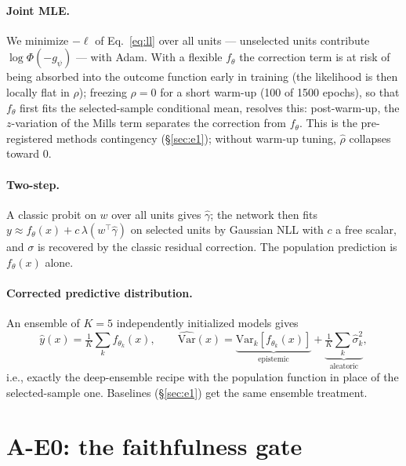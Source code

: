 \documentclass[10pt]{article}
\newcommand{\IMR}{\lambda}
\begin{document}
\paragraph{Joint MLE.} We minimize $-\ell$ of Eq.~\eqref{eq:ll} over all
units --- unselected units contribute $\log\Phi(-g_\psi)$ --- with Adam.
With a flexible $f_\theta$ the correction term is at risk of being
absorbed into the outcome function early in training (the likelihood is
then locally flat in $\rho$); freezing $\rho = 0$ for a short warm-up
(100 of 1500 epochs), so that $f_\theta$ first fits the selected-sample
conditional mean, resolves this: post-warm-up, the $z$-variation of the
Mills term separates the correction from $f_\theta$. This is the
pre-registered methods contingency (\S\ref{sec:e1}); without warm-up
tuning, $\hat\rho$ collapses toward $0$.

\paragraph{Two-step.} A classic probit on $w$ over all units gives
$\hat\gamma$; the network then fits $y \approx f_\theta(x) + c\,
\IMR(w^\top\hat\gamma)$ on selected units by Gaussian NLL with $c$ a free
scalar, and $\sigma$ is recovered by the classic residual correction.
The population prediction is $f_\theta(x)$ alone.

\paragraph{Corrected predictive distribution.} An ensemble of $K = 5$
independently initialized models gives
\begin{equation}
\hat y(x) = \tfrac1K\sum_k f_{\theta_k}(x), \qquad
\widehat{\mathrm{Var}}(x) = \underbrace{\mathrm{Var}_k[f_{\theta_k}(x)]}_{\text{epistemic}}
+ \underbrace{\tfrac1K\sum_k \hat\sigma_k^2}_{\text{aleatoric}},
\end{equation}
i.e., exactly the deep-ensemble recipe with the population function in
place of the selected-sample one. Baselines (\S\ref{sec:e1}) get the same
ensemble treatment.

\section{A-E0: the faithfulness gate}
\label{sec:e0}
\end{document}
